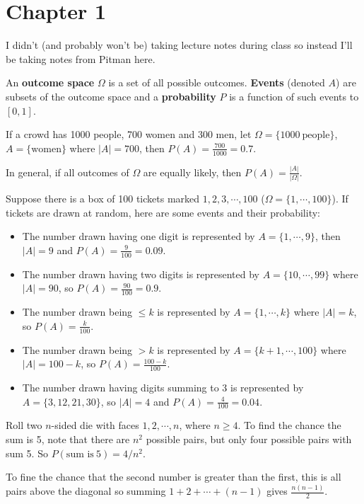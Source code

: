 \section{Chapter 1} 
I didn't (and probably won't be) taking lecture notes during class so instead I'll be taking notes from Pitman here.

\begin{definition}[]
    An \textbf{outcome space} $\Omega$ is a set of all possible outcomes. \textbf{Events} (denoted $A$) are subsets of the outcome space and a \textbf{probability} $P$ is a function of such events to $[0,1]$.
\end{definition}
\begin{example}
    If a crowd has 1000 people, 700 women and 300 men, let $\Omega=\{ 1000 \ \text{people} \} $, $A= \{ \text{women} \} $ where $|A|=700$, then $P(A)=\frac{700}{1000}=0.7$.
\end{example}
In general, if all outcomes of $\Omega$ are equally likely, then $P(A)= \frac{|A|}{| \Omega|}  $.

\begin{example}
    Suppose there is a box of 100 tickets marked $1,2,3, \cdots ,100$ ($\Omega=\{1,\cdots ,100\} $). If tickets are drawn at random, here are some events and their probability:
    \begin{itemize}
    \setlength\itemsep{-.2em}
\item The number drawn having one digit is represented by $A= \{1,\cdots ,9\} $, then $|A|=9$ and $P(A)=\frac{9}{100}=0.09$.
\item The number drawn having two digits is represented by $A= \{10,\cdots ,99\} $ where $|A|=90$, so $P(A)= \frac{90}{100}=0.9$.
\item The number drawn being $\leq k$ is represented by $A=\{1,\cdots ,k\} $ where $|A|=k$, so $P(A)=\frac{k}{100}$.
\item The number drawn being $>k$ is represented by $A=\{k+1,\cdots ,100\} $ where $|A|=100-k$, so $P(A)=\frac{100-k}{100}$.
\item The number drawn having digits summing to 3 is represented by $A=\{3,12,21,30\} $, so $|A|=4$ and $P(A)=\frac{4}{100}=0.04$.
    \end{itemize}
\end{example}

\begin{example}
    Roll two $n$-sided die with faces $1,2, \cdots ,n$, where $n \geq 4$. To find the chance the sum is 5, note that there are $n^2$ possible pairs, but only four possible pairs with sum 5. So $P(\text{sum is} \ 5)=4 /n^2$. 

    To fine the chance that the second number is greater than the first, this is all pairs above the diagonal so summing $1+2+ \cdots +(n-1)$ gives $\frac{n(n-1)}{2}$.
\end{example}
